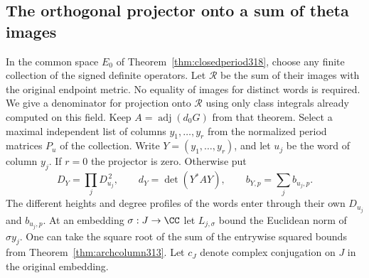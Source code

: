 \documentclass[a4paper,11pt]{article}
\theoremstyle{definition}
\theoremstyle{remark}
\numberwithin{equation}{section}
\begin{document}
\subsection{The orthogonal projector onto a sum of theta images}\label{nav:VI-64}
In the common space \(E_0\) of Theorem~\ref{thm:closedperiod318},
choose any finite collection of the signed definite operators.
Let \(\mathcal R\) be the sum of their images with the original
endpoint metric. No equality of images for distinct words
is required. We give a denominator for projection onto
\(\mathcal R\) using only class integrals already computed on
this field. Keep \(A=\operatorname{adj}(d_0G)\) from that
theorem. Select a maximal independent list of columns
\(y_1,\ldots,y_r\) from the normalized period matrices
\(P_u\) of the collection. Write \(Y=(y_1,\ldots,y_r)\),
and let \(u_j\) be the word of column \(y_j\). If \(r=0\)
the projector is zero. Otherwise put
\[
 D_Y=\prod_j D_{u_j}^{\,2},\qquad
 d_Y=\det(Y^* A Y),\qquad b_{Y,p}=\sum_j b_{u_j,p}.
\]
The different heights and degree profiles of the words
enter through their own \(D_{u_j}\) and \(b_{u_j,p}\).
At an embedding \(\sigma:J\to\CC\) let \(L_{j,\sigma}\)
bound the Euclidean norm of \(\sigma y_j\). One can take
the square root of the sum of the entrywise squared bounds
from Theorem~\ref{thm:archcolumn313}. Let \(c_J\) denote
complex conjugation on \(J\) in the original embedding.
\end{document}
